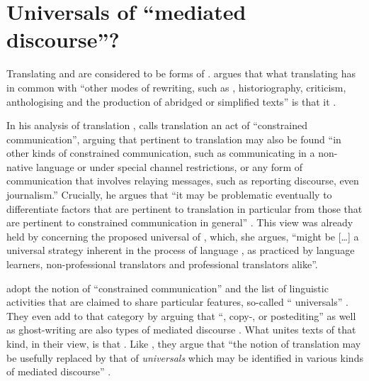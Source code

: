\documentclass[output=paper]{LSP/langsci}
\begin{document}
\section{Universals of \enquote{mediated discourse}?}\label{bisiada:sec:lit}

Translating and  are considered to be forms of . \citeauthor{lefevere92} argues that what translating has in common with \enquote{other modes of rewriting, such as , historiography, criticism, anthologising and the production of abridged or simplified texts} is that it .

In his analysis of translation , \textcite{chesterman04} calls translation an act of \enquote{constrained communication}, arguing that  pertinent to translation may also be found ``in other kinds of constrained communication, such as communicating in a non-native language or under special channel restrictions, or any form of communication that involves relaying messages, such as reporting discourse, even journalism.'' \citep[10--11]{chesterman04} Crucially, he argues that ``it may be problematic eventually to differentiate factors that are pertinent to translation in particular from those that are pertinent to constrained communication in general'' \citep[10--11]{chesterman04}. This view was already held by \textcite[21]{BlumKulka1986} concerning the proposed universal of , which, she argues, \enquote{might be [\ldots] a universal strategy inherent in the process of language , as practiced by language learners, non-professional translators and professional translators alike}.

\textcite{ulrmur08} adopt the notion of \enquote{constrained communication} and the list of linguistic activities that are claimed to share particular features, so-called \enquote{ universals} \parencite*[149]{ulrmur08}. They even add to that category by arguing that \enquote{, copy-,  or postediting} as well as ghost-writing are also types of mediated discourse \parencite*[150]{ulrmur08}. What unites texts of that kind, in their view, is that . Like \citeauthor{chesterman04}, they argue that ``the notion of translation  may be usefully replaced by that of \emph{ universals} which may be identified in various kinds of mediated discourse'' \citep[149]{ulrmur08}. 
\end{document}

